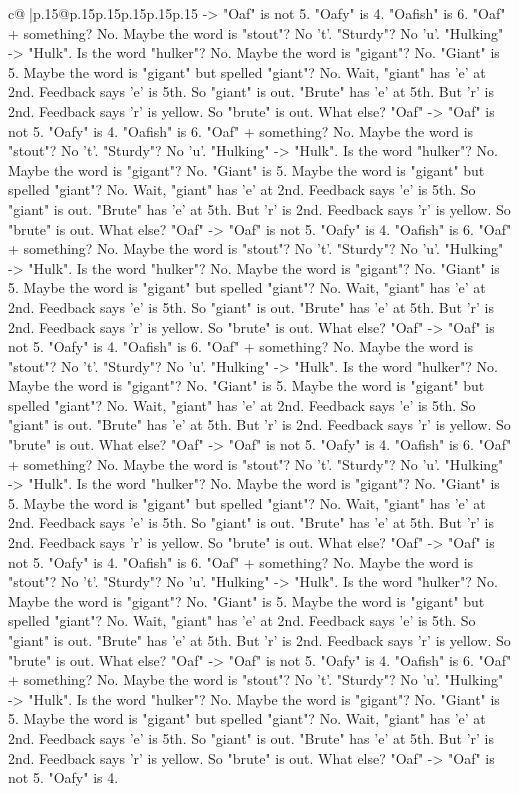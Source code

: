 \documentclass{article}
\begin{document}
{\begin{supertabular}{c@{$\;$}|p{.15\linewidth}@{}p{.15\linewidth}p{.15\linewidth}p{.15\linewidth}p{.15\linewidth}p{.15\linewidth}}
{{{{-}> "Oaf" is not 5. "Oafy" is 4. "Oafish" is 6. "Oaf" + something? No. Maybe the word is "stout"? No 't'. "Sturdy"? No 'u'. "Hulking" {-}> "Hulk". Is the word "hulker"? No. Maybe the word is "gigant"? No. "Giant" is 5. Maybe the word is "gigant" but spelled "giant"? No. Wait, "giant" has 'e' at 2nd. Feedback says 'e' is 5th. So "giant" is out. "Brute" has 'e' at 5th. But 'r' is 2nd. Feedback says 'r' is yellow. So "brute" is out. What else? "Oaf" {-}> "Oaf" is not 5. "Oafy" is 4. "Oafish" is 6. "Oaf" + something? No. Maybe the word is "stout"? No 't'. "Sturdy"? No 'u'. "Hulking" {-}> "Hulk". Is the word "hulker"? No. Maybe the word is "gigant"? No. "Giant" is 5. Maybe the word is "gigant" but spelled "giant"? No. Wait, "giant" has 'e' at 2nd. Feedback says 'e' is 5th. So "giant" is out. "Brute" has 'e' at 5th. But 'r' is 2nd. Feedback says 'r' is yellow. So "brute" is out. What else? "Oaf" {-}> "Oaf" is not 5. "Oafy" is 4. "Oafish" is 6. "Oaf" + something? No. Maybe the word is "stout"? No 't'. "Sturdy"? No 'u'. "Hulking" {-}> "Hulk". Is the word "hulker"? No. Maybe the word is "gigant"? No. "Giant" is 5. Maybe the word is "gigant" but spelled "giant"? No. Wait, "giant" has 'e' at 2nd. Feedback says 'e' is 5th. So "giant" is out. "Brute" has 'e' at 5th. But 'r' is 2nd. Feedback says 'r' is yellow. So "brute" is out. What else? "Oaf" {-}> "Oaf" is not 5. "Oafy" is 4. "Oafish" is 6. "Oaf" + something? No. Maybe the word is "stout"? No 't'. "Sturdy"? No 'u'. "Hulking" {-}> "Hulk". Is the word "hulker"? No. Maybe the word is "gigant"? No. "Giant" is 5. Maybe the word is "gigant" but spelled "giant"? No. Wait, "giant" has 'e' at 2nd. Feedback says 'e' is 5th. So "giant" is out. "Brute" has 'e' at 5th. But 'r' is 2nd. Feedback says 'r' is yellow. So "brute" is out. What else? "Oaf" {-}> "Oaf" is not 5. "Oafy" is 4. "Oafish" is 6. "Oaf" + something? No. Maybe the word is "stout"? No 't'. "Sturdy"? No 'u'. "Hulking" {-}> "Hulk". Is the word "hulker"? No. Maybe the word is "gigant"? No. "Giant" is 5. Maybe the word is "gigant" but spelled "giant"? No. Wait, "giant" has 'e' at 2nd. Feedback says 'e' is 5th. So "giant" is out. "Brute" has 'e' at 5th. But 'r' is 2nd. Feedback says 'r' is yellow. So "brute" is out. What else? "Oaf" {-}> "Oaf" is not 5. "Oafy" is 4. "Oafish" is 6. "Oaf" + something? No. Maybe the word is "stout"? No 't'. "Sturdy"? No 'u'. "Hulking" {-}> "Hulk". Is the word "hulker"? No. Maybe the word is "gigant"? No. "Giant" is 5. Maybe the word is "gigant" but spelled "giant"? No. Wait, "giant" has 'e' at 2nd. Feedback says 'e' is 5th. So "giant" is out. "Brute" has 'e' at 5th. But 'r' is 2nd. Feedback says 'r' is yellow. So "brute" is out. What else? "Oaf" {-}> "Oaf" is not 5. "Oafy" is 4. "Oafish" is 6. "Oaf" + something? No. Maybe the word is "stout"? No 't'. "Sturdy"? No 'u'. "Hulking" {-}> "Hulk". Is the word "hulker"? No. Maybe the word is "gigant"? No. "Giant" is 5. Maybe the word is "gigant" but spelled "giant"? No. Wait, "giant" has 'e' at 2nd. Feedback says 'e' is 5th. So "giant" is out. "Brute" has 'e' at 5th. But 'r' is 2nd. Feedback says 'r' is yellow. So "brute" is out. What else? "Oaf" {-}> "Oaf" is not 5. "Oafy" is 4. }}}
\end{supertabular}}
\end{document}
